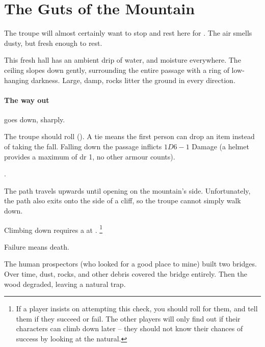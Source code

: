 \section{The Guts of the Mountain}

\begin{multicols}{2}


The troupe will almost certainly want to stop and rest here for .
The air smells dusty, but fresh enough to rest.

\begin{boxtext}
  This fresh hall has an ambient drip of water, and moisture everywhere.
  The ceiling slopes down gently, surrounding the entire passage with a ring of low-hanging darkness.
  Large, damp, rocks litter the ground in every direction.
\end{boxtext}

\paragraph{The way out}
goes down, sharply.

The troupe should roll  (\tn[10]).
A tie means the first person can drop an item instead of taking the fall.
Falling down the passage inflicts $1D6-1$ Damage (a helmet provides a maximum of \gls{dr} 1, no other armour counts).

.



The path travels upwards until opening on the mountain's side.
Unfortunately, the path also exits onto the side of a cliff, so the troupe cannot simply walk down.

Climbing down requires a  at \tn[14].%
\footnote{If a player insists on attempting this check, you should roll for them, and tell them if they succeed or fail.  The other players will only find out if their characters can climb down later -- they should not know their chances of success by looking at the \gls{natural}.}

Failure means death.


\begin{exampletext}
  The human prospectors (who looked for a good place to mine) built two bridges.
  Over time, dust, rocks, and other debris covered the bridge entirely.
  Then the wood degraded, leaving a natural trap.


\end{exampletext}
\end{multicols}
